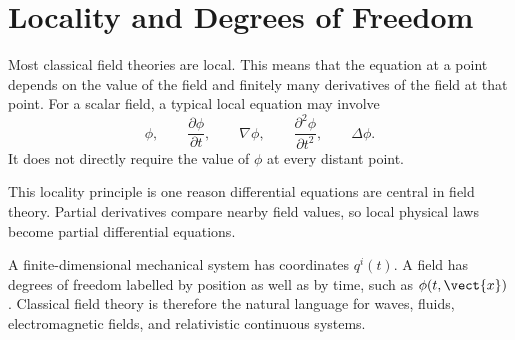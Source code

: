 \section{Locality and Degrees of Freedom}

Most classical field theories are local. This means that the equation at a point
depends on the value of the field and finitely many derivatives of the field at
that point. For a scalar field, a typical local equation may involve
\[
    \phi, \qquad
    \frac{\partial \phi}{\partial t}, \qquad
    \nabla \phi, \qquad
    \frac{\partial^2 \phi}{\partial t^2}, \qquad
    \Delta \phi.
\]
It does not directly require the value of \(\phi\) at every distant point.

This locality principle is one reason differential equations are central in
field theory. Partial derivatives compare nearby field values, so local
physical laws become partial differential equations.

\begin{summarybox}
A finite-dimensional mechanical system has coordinates \(q^i(t)\). A field has
degrees of freedom labelled by position as well as by time, such as
\(\phi(t,\vect{x})\). Classical field theory is therefore the natural language
for waves, fluids, electromagnetic fields, and relativistic continuous systems.
\end{summarybox}
